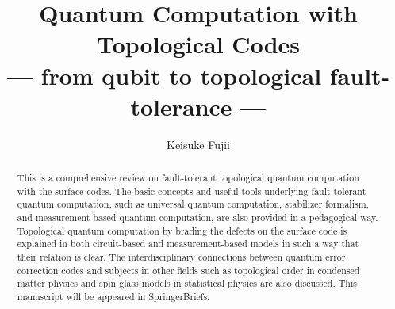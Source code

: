 \documentclass[11pt,notitlepage]{report}
\begin{document}
\setlength{\baselineskip}{15pt}
\author[1,2,3]{Keisuke Fujii}


\title{Quantum Computation with Topological Codes\\
--- from qubit to topological fault-tolerance ---}

\maketitle
\begin{abstract}
This is a comprehensive review on fault-tolerant topological quantum computation 
with the surface codes. The basic concepts and useful tools
underlying fault-tolerant quantum computation,
such as universal quantum computation,
stabilizer formalism, and measurement-based quantum computation, 
are also provided in a pedagogical way.
Topological quantum computation 
by brading the defects on the surface code
is explained in both circuit-based and measurement-based models
in such a way that their relation is clear.
The interdisciplinary connections between quantum error correction codes
and subjects in other fields such as 
topological order in condensed matter physics and 
spin glass models in statistical physics
are also discussed.
This manuscript will be appeared in SpringerBriefs.
\end{abstract}
\tableofcontents


%	
%

%


%


%









\printindex
%
%



%



\end{document}

